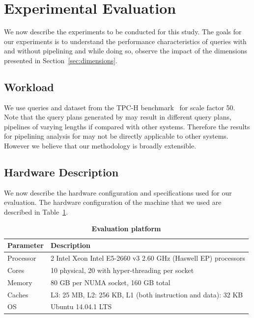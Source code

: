 \section{Experimental Evaluation}\label{sec:experiments}
We now describe the experiments to be conducted for this study.
The goals for our experiments is to understand the performance characteristics of queries with and without pipelining and while doing so, observe the impact of the dimensions presented in Section~\ref{sec:dimensions}. 

\subsection{Workload}
We use queries and dataset from the TPC-H benchmark~\cite{tpc-h} for scale factor 50.
Note that the query plans generated by \sys{} may result in different query plans, pipelines of varying lengths if compared with other systems.
Therefore the results for pipelining analysis for \sys{} may not be directly applicable to other systems.
However we believe that our methodology is broadly extensible. 

\subsection{Hardware Description}\label{ssec:hardware-description}
We now describe the hardware configuration and \sys{} specifications used for our evaluation. 
The hardware configuration of the machine that we used are described in Table~\ref{table:hardware-pipeline}.

\begin{table}[h]
	\centering
	\begin{tabular}{|l|l|}
		\hline
		\textbf{Parameter} & \textbf{Description} \\ \hline
		Processor & 2 Intel Xeon Intel E5-2660 v3 2.60 GHz (Haswell EP) processors\\ \hline
		Cores & 10 physical, 20 with hyper-threading per socket \\ \hline
		Memory & 80 GB per NUMA socket, 160 GB total \\ \hline
		Caches & L3: 25 MB, L2: 256 KB, L1 (both instruction and data): 32 KB \\ \hline
		OS & Ubuntu 14.04.1 LTS \\ \hline
	\end{tabular}
	\caption{\textbf{Evaluation platform}}
	\label{table:hardware-pipeline}
\end{table}

